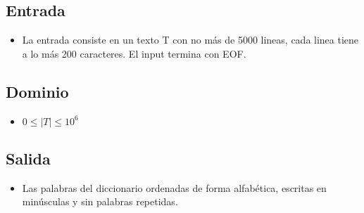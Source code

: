 \documentclass{article}
\begin{document}
\begin{flushleft}
\subsection*{Entrada}
\begin{itemize}
    \item La entrada consiste en un texto T con no más de 5000 lineas, cada linea tiene a lo más 200 caracteres. 
        El input termina con EOF.
\end{itemize}
\subsection*{Dominio}
\begin{itemize}
        \item $ 0 \leq |T| \leq 10 ^ 6$
\end{itemize}
\subsection*{Salida}
\begin {itemize}
    \item Las palabras del diccionario ordenadas de forma alfabética, 
        escritas en minúsculas y sin palabras repetidas.
\end {itemize}

\end{flushleft}
\end{document}

